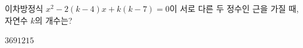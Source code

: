 이차방정식 $x^2-2(k-4)x+k(k-7)=0$이 서로 다른 두 정수인 근을 가질 때, 자연수 $k$의 개수는?
\begin{choices32}{$3$}{$6$}{$9$}{$12$}{$15$}\end{choices32}
